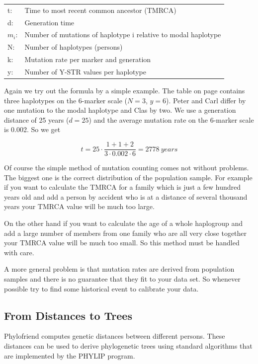 \begin{tabular}{ll}
t: & Time to most recent common ancestor (TMRCA)\\
d: & Generation time\\
$m_i$: &  Number of mutations of haplotype i relative to modal haplotype\\
N: &  Number of haplotypes (persons) \\
k: &  Mutation rate per marker and generation\\
y: &  Number of Y-STR values per haplotype
\end{tabular}
\vspace{1em}

Again we try out the formula by a simple example. The table
on page \pageref{tblmodalhaplotype} contains three haplotypes
on the 6-marker scale ($N=3$, $y=6$). Peter and Carl differ
by one mutation to the modal haplotype and Clas by two. We
use a generation distance of 25 years ($d=25$) and the average
mutation rate on the 6-marker scale is 0.002\cite{Kly09}. So
we get

\begin{equation}
t = 25 \cdot \frac{1 + 1 + 2}{3 \cdot 0.002 \cdot 6} = 2778\ years
\end{equation}

Of course the simple method of mutation counting comes not without
problems. The biggest one is the correct distribution of the
population sample. For example if you want to calculate the
TMRCA for a family which is just a few hundred years old
and add a person by accident who is at a distance of several
thousand years your TMRCA value will be much too large.

On the other hand if you want to calculate the age of a whole
haplogroup and add a large number of members from one family
who are all very close together your TMRCA value will be much
too small. So this method must be handled with care.

A more general problem is that mutation rates are derived
from population samples and there is no guarantee that they
fit to your data set. So whenever possible try to find some
historical event to calibrate your data.


\subsection{From Distances to Trees}

Phylofriend computes genetic distances between different
persons. These distances can be used to derive phylogenetic
trees using standard algorithms that are implemented by
the PHYLIP\cite{Phylip} program.

